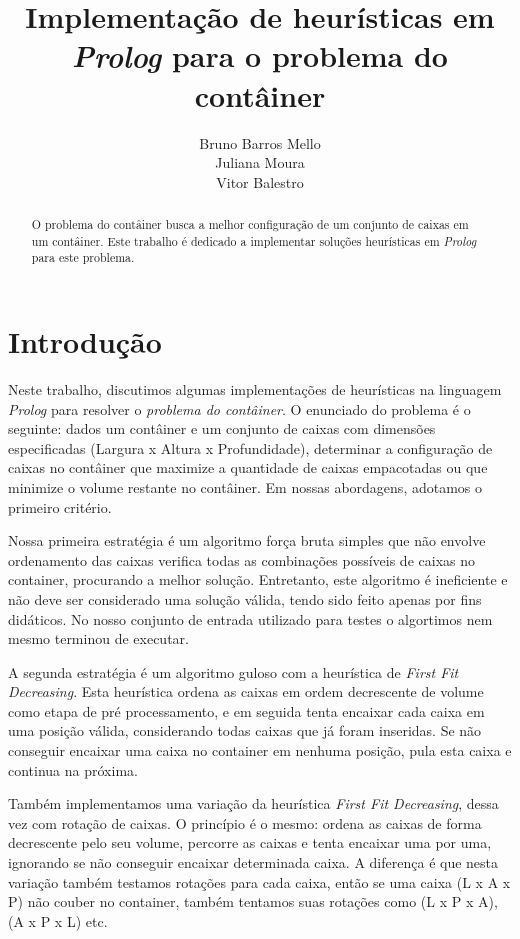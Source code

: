 \documentclass[12pt]{article}
\title{Implementação de heurísticas em \emph{Prolog} para o problema do contâiner}
\author{Bruno Barros Mello\inst{1} \\ Juliana Moura\inst{1} \\  Vitor
  Balestro\inst{1,2} }
\begin{document}
\maketitle

\begin{abstract} O problema do contâiner busca a melhor configuração de um conjunto de caixas em um contâiner. Este trabalho é dedicado a implementar soluções heurísticas em \emph{Prolog} para este problema.

\end{abstract}


\section{Introdução}

Neste trabalho, discutimos algumas implementações de heurísticas na linguagem \emph{Prolog} para resolver o \emph{problema do contâiner}. O enunciado do problema é o seguinte: dados um contâiner e um conjunto de caixas com dimensões especificadas (Largura x Altura x Profundidade), determinar a configuração de caixas no contâiner que maximize a quantidade de caixas empacotadas ou que minimize o volume restante no contâiner. Em nossas abordagens, adotamos o primeiro critério.

Nossa primeira estratégia é um algoritmo força bruta simples que não envolve ordenamento das caixas verifica todas as combinações possíveis de caixas no container, procurando a melhor solução. Entretanto, este algoritmo é ineficiente e não deve ser considerado uma solução válida, tendo sido feito apenas por fins didáticos. No nosso conjunto de entrada utilizado para testes o algortimos nem mesmo terminou de executar.

A segunda estratégia é um algoritmo guloso com a heurística de \emph{First Fit Decreasing}. Esta heurística ordena as caixas em ordem decrescente de volume como etapa de pré processamento, e em seguida tenta encaixar cada caixa em uma posição válida, considerando todas caixas que já foram inseridas. Se não conseguir encaixar uma caixa no container em nenhuma posição, pula esta caixa e continua na próxima.

Também implementamos uma variação da heurística \emph{First Fit Decreasing}, dessa vez com rotação de caixas. O princípio é o mesmo: ordena as caixas de forma decrescente pelo seu volume, percorre as caixas e tenta encaixar uma por uma, ignorando se não conseguir encaixar determinada caixa. A diferença é que nesta variação também testamos rotações para cada caixa, então se uma caixa (L x A x P) não couber no container, também tentamos suas rotações como (L x P x A), (A x P x L) etc.
\end{document}
